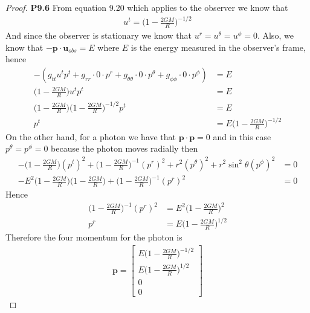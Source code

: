 \documentclass[11pt]{article}
\theoremstyle{definition}
\begin{document}
\cleardoublepage
\begin{proof}{\textbf{P9.6}}
    From equation 9.20 which applies to the observer we know that
    \begin{align*}
        u^{t} = \bigg(1 - \frac{2GM}{R}\bigg)^{-1/2}
    \end{align*}
    And since the observer is stationary we know that
    $u^r = u^\theta = u^\phi = 0$.
    Also, we know that $-\bm{p}\cdot \bm{u}_{obs} = E$ where $E$ is the energy
    measured in the observer's frame, hence
    \begin{align*}
        -(g_{tt}u^{t}p^{t} + g_{rr}\cdot 0\cdot p^r
        + g_{\theta\theta}\cdot0\cdot p^\theta
        + g_{\phi\phi}\cdot0\cdot p^\phi) &= E\\
        \bigg(1-\frac{2GM}{R}\bigg)u^{t}p^{t} &= E\\
        \bigg(1-\frac{2GM}{R}\bigg)\bigg(1 - \frac{2GM}{R}\bigg)^{-1/2}p^t &= E\\
        p^t &= E\bigg(1 - \frac{2GM}{R}\bigg)^{-1/2}
    \end{align*}
    On the other hand, for a photon we have that
    $\bm{p}\cdot\bm{p} = 0$ and in this case $p^\theta = p^\phi = 0$ because
    the photon moves radially then
    \begin{align*}
        -\bigg(1-\frac{2GM}{R}\bigg)(p^t)^2
        + \bigg(1-\frac{2GM}{R}\bigg)^{-1}(p^r)^2
        + r^2(p^\theta)^2
        + r^2\sin^2\theta(p^\phi)^2 &= 0\\
        -E^2\bigg(1 - \frac{2GM}{R}\bigg)\bigg(1-\frac{2GM}{R}\bigg)
        + \bigg(1-\frac{2GM}{R}\bigg)^{-1}(p^r)^2 &= 0
    \end{align*}
    Hence
    \begin{align*}
        \bigg(1-\frac{2GM}{R}\bigg)^{-1}(p^r)^2 &= 
        E^2\bigg(1 - \frac{2GM}{R}\bigg)^2\\
        p^r &= E\bigg(1 - \frac{2GM}{R}\bigg)^{1/2}
    \end{align*}
    Therefore the four momentum for the photon is
    \begin{align*}
        \bm{p} = \begin{bmatrix}
            E\bigg(1 - \frac{2GM}{R}\bigg)^{-1/2}\\
            E\bigg(1 - \frac{2GM}{R}\bigg)^{1/2}\\ 0\\ 0
        \end{bmatrix}
    \end{align*}
\end{proof}
\end{document}
